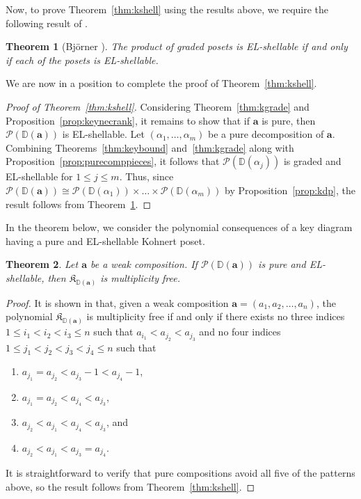 \documentclass[letterpaper,10pt]{article}
\newtheorem{theorem}{Theorem}
\begin{document}
Now, to prove Theorem~\ref{thm:kshell} using the results above, we require the following result of \textbf{\cite{Bjorner}}.


\begin{theorem}[Bj\"orner \textbf{\cite{Bjorner}}]\label{thm:pshell}
    The product of graded posets is EL-shellable if and only if each of the posets is EL-shellable.
\end{theorem}

We are now in a position to complete the proof of Theorem~\ref{thm:kshell}.

\begin{proof}[Proof of Theorem~\ref{thm:kshell}]
Considering Theorem~\ref{thm:kgrade} and Proposition~\ref{prop:keynecrank}, it remains to show that if $\mathbf{a}$ is pure, then $\mathcal{P}(\mathbb{D}(\mathbf{a}))$ is EL-shellable. Let $(\alpha_1,\hdots,\alpha_m)$ be a pure decomposition of $\mathbf{a}$. Combining Theorems~\ref{thm:keybound} and~\ref{thm:kgrade} along with Proposition~\ref{prop:purecomppieces}, it follows that $\mathcal{P}(\mathbb{D}(\alpha_j))$ is graded and EL-shellable for $1\le j\le m$. Thus, since $\mathcal{P}(\mathbb{D}(\mathbf{a}))\cong\mathcal{P}(\mathbb{D}(\alpha_1))\times\hdots\times \mathcal{P}(\mathbb{D}(\alpha_m))$ by Proposition~\ref{prop:kdp}, the result follows from Theorem~\ref{thm:pshell}.
\end{proof}

In the theorem below, we consider the polynomial consequences of a key diagram having a pure and EL-shellable Kohnert poset.

\begin{theorem}\label{thm:keymf}
    Let $\mathbf{a}$ be a weak composition. If $\mathcal{P}(\mathbb{D}(\mathbf{a}))$ is pure and EL-shellable, then $\mathfrak{K}_{\mathbb{D}(\mathbf{a})}$ is multiplicity free.
\end{theorem}
\begin{proof}
    It is shown in \textbf{\cite{key}} that, given a weak composition $\mathbf{a}=(a_1,a_2,\hdots,a_n)$, the polynomial $\mathfrak{K}_{\mathbb{D}(\mathbf{a})}$ is multiplicity free if and only if there exists no three indices $1\le i_1<i_2<i_3\le n$ such that $a_{i_1}<a_{j_2}<a_{j_3}$
    and no four indices $1\le j_1<j_2<j_3<j_4\le n$ such that
    \begin{enumerate}
        \item $a_{j_1}=a_{j_2}<a_{j_3}-1<a_{j_4}-1$,
        \item $a_{j_1}=a_{j_2}<a_{j_4}<a_{j_3}$,
        \item $a_{j_2}<a_{j_1}<a_{j_4}<a_{j_3}$, and
        \item $a_{j_2}<a_{j_1}<a_{j_3}=a_{j_4}$.
    \end{enumerate}
    It is straightforward to verify that pure compositions avoid all five of the patterns above, so the result follows from Theorem~\ref{thm:kshell}.
\end{proof}
\end{document}
